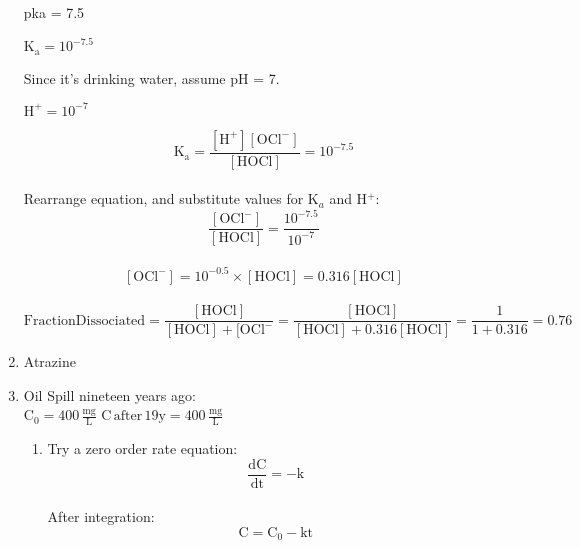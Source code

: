 \documentclass[12pt,letterpaper]{article}
\begin{document}
\begin{enumerate}
pka = 7.5

$\mathrm{K_a} = 10^{-7.5}$

Since it's drinking water, assume pH = 7.

$\mathrm{H^+} = 10^{-7}$

\begin{equation*}
\mathrm{K_a = \frac{[H^+][OCl^-]}{[HOCl]} = 10^{-7.5}}
\end{equation*}\\

Rearrange equation, and substitute values for K$_a$ and H$^+$:\\

\begin{equation*}
\mathrm{\frac{[OCl^-]}{[HOCl]} = \frac{10^{-7.5}}{10^{-7}}}
\end{equation*}\\

\begin{equation*}
\mathrm{[OCl^-] = 10^{-0.5}\times [HOCl] = 0.316[HOCl]}
\end{equation*}\\

\begin{equation*}
\mathrm{Fraction Dissociated = \frac{[HOCl]}{[HOCl] + [OCl^-} = \frac{[HOCl]}{[HOCl] + 0.316[HOCl]} = \frac{1}{1+ 0.316} = 0.76}
\end{equation*}


\vspace{0.2in}

\item Atrazine




\item Oil Spill nineteen years ago:\\

$\mathrm{C_0 = 400\, \frac{mg}{L}}$
$\mathrm{C \, after\, 19 y = 400\, \frac{mg}{L}}$
\begin{enumerate}

\item Try a zero order rate equation:
\begin{equation*}
\mathrm{\frac{dC}{dt} = -k}
\end{equation*}\\

After integration:\\

\begin{equation*}
\mathrm{C = C_0 -kt}
\end{equation*}


\end{enumerate}
\end{enumerate}
\end{document}
